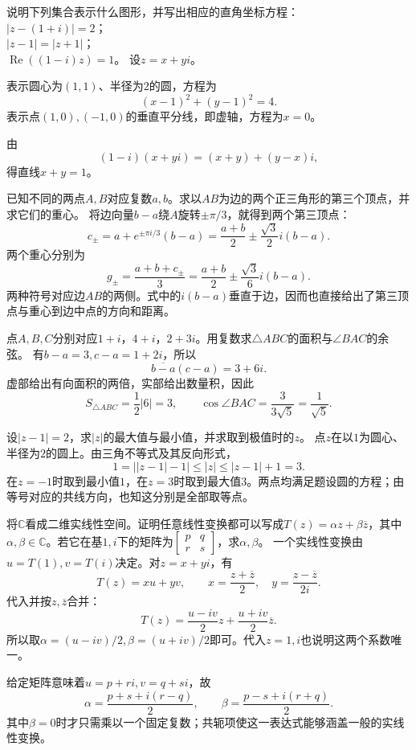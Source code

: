 说明下列集合表示什么图形，并写出相应的直角坐标方程：\\
\(\left| z - \left( 1 + i \right) \right| = 2\)；\\
\(\left| z - 1 \right| = \left| z + 1 \right|\)；\\
\(\operatorname{Re} \left( \left( 1 - i \right) z \right) = 1\)。
\solutionanswer
设\(z=x+yi\)。

表示圆心为\((1,1)\)、半径为\(2\)的圆，方程为
\[
(x-1)^2+(y-1)^2=4.
\]
表示点\((1,0),(-1,0)\)的垂直平分线，即虚轴，方程为\(x=0\)。

由
\[
(1-i)(x+yi)=(x+y)+(y-x)i,
\]
得直线\(x+y=1\)。


已知不同的两点\(A , B\)对应复数\(a , b\)。求以\(A B\)为边的两个正三角形的第三个顶点，并求它们的重心。
\solutionanswer
将边向量\(b-a\)绕\(A\)旋转\(\pm\pi/3\)，就得到两个第三顶点：
\[
c_\pm=a+e^{\pm\pi i/3}(b-a)
=\frac{a+b}2\pm\frac{\sqrt3}{2}i(b-a).
\]
两个重心分别为
\[
g_\pm=\frac{a+b+c_\pm}3
=\frac{a+b}2\pm\frac{\sqrt3}{6}i(b-a).
\]
两种符号对应边\(AB\)的两侧。式中的\(i(b-a)\)垂直于边，因而也直接给出了第三顶点与重心到边中点的方向和距离。


点\(A , B , C\)分别对应\(1 + i\)，\(4 + i\)，\(2 + 3 i\)。用复数求\(\triangle A B C\)的面积与\(\angle B A C\)的余弦。
\solutionanswer
有\(b-a=3,c-a=1+2i\)，所以
\[
\overline{b-a}(c-a)=3+6i.
\]
虚部给出有向面积的两倍，实部给出数量积，因此
\[
S_{\triangle ABC}=\frac12|6|=3,\qquad
\cos\angle BAC=\frac3{3\sqrt5}=\frac1{\sqrt5}.
\]


设\(\left| z - 1 \right| = 2\)，求\(\left| z \right|\)的最大值与最小值，并求取到极值时的\(z\)。
\solutionanswer
点\(z\)在以\(1\)为圆心、半径为\(2\)的圆上。由三角不等式及其反向形式，
\[
1=\bigl||z-1|-1\bigr|\le|z|\le|z-1|+1=3.
\]
在\(z=-1\)时取到最小值\(1\)，在\(z=3\)时取到最大值\(3\)。两点均满足题设圆的方程；由等号对应的共线方向，也知这分别是全部取等点。


将\(\mathbb{C}\)看成二维实线性空间。证明任意线性变换都可以写成\(T \left( z \right) = \alpha z + \beta \overline{z}\)，其中\(\alpha , \beta \in \mathbb{C}\)。若它在基\(1 , i\)下的矩阵为\(\left[ \begin{smallmatrix}p & q \\ r & s\end{smallmatrix} \right]\)，求\(\alpha , \beta\)。
\solutionanswer
一个实线性变换由\(u=T(1),v=T(i)\)决定。对\(z=x+yi\)，有
\[
T(z)=xu+yv,\qquad
x=\frac{z+\overline z}2,\quad y=\frac{z-\overline z}{2i}.
\]
代入并按\(z,\overline z\)合并：
\[
T(z)=\frac{u-iv}2z+\frac{u+iv}2\overline z.
\]
所以取\(\alpha=(u-iv)/2,\beta=(u+iv)/2\)即可。代入\(z=1,i\)也说明这两个系数唯一。

给定矩阵意味着\(u=p+ri,v=q+si\)，故
\[
\boxed{\quad
\alpha=\frac{p+s+i(r-q)}2,\qquad
\beta=\frac{p-s+i(r+q)}2.\quad}
\]
其中\(\beta=0\)时才只需乘以一个固定复数；共轭项使这一表达式能够涵盖一般的实线性变换。
\par
